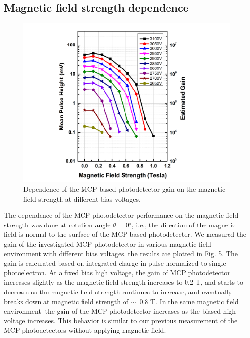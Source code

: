 \documentclass[preprint,5p]{elsarticle}
\begin{document}
\subsection{Magnetic field strength dependence}\label{subsec_HV}
\begin{figure}[tbp]
\hspace{-1.0 cm} 
\includegraphics[scale=0.1]{fig/MCPs_gain_B_HV.png}
\caption{Dependence of the MCP-based photodetector gain on the magnetic field 
strength at different bias voltages.} \label{fig:MCPs_gain_B_HV}
\end{figure}

The dependence of the MCP photodetector performance on the magnetic field 
strength was done at rotation angle $\theta$ = 0$^{\circ}$, i.e., the direction 
of the magnetic field is normal to the surface of the MCP-based photodetector.  
We measured the gain of the investigated MCP photodetector in various magnetic 
field environment with different bias voltages, the results are plotted in Fig.  
5. The gain is calculated based on integrated charge in pulse normalized to 
single photoelectron. At a fixed bias high voltage, the gain of MCP 
photodetector increases slightly as the magnetic field strength increases to 
0.2 T, and starts to decrease as the magnetic field strength continues to 
increase, and eventually breaks down at magnetic field strength of $\sim$~0.8 
T.  In the same magnetic field environment, the gain of the MCP photodetector 
increases as the biased high voltage increases. This behavior is similar to our 
previous measurement of the MCP photodetectors without applying magnetic field. 
\end{document}
